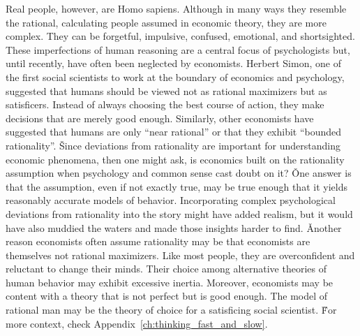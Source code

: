 Real people, however, are Homo sapiens. Although in many ways they resemble the rational, calculating people assumed
in economic theory, they are more complex. They can be forgetful, impulsive, confused, emotional, and shortsighted.
These imperfections of human reasoning are a central focus of psychologists but, until recently, have often been
neglected by economists. Herbert Simon, one of the first social scientists to work at the boundary of economics and
psychology, suggested that humans should be viewed not as rational maximizers but as satisficers. Instead of always
choosing the best course of action, they make decisions that are merely good enough. Similarly, other economists have
suggested that humans are only ``near rational'' or that they exhibit ``bounded rationality''. \v

Since deviations from rationality are important for understanding economic phenomena, then one might ask, is
economics built on the rationality assumption when psychology and common sense cast doubt on it? \v

One answer is that the assumption, even if not exactly true, may be true enough that it yields reasonably accurate
models of behavior. Incorporating complex psychological deviations from rationality into the story might have added
realism, but it would have also muddied the waters and made those insights harder to find. \v

Another reason economists often assume rationality may be that economists are themselves not rational maximizers.
Like most people, they are overconfident and reluctant to change their minds. Their choice among alternative theories
of human behavior may exhibit excessive inertia. Moreover, economists may be content with a theory that is not
perfect but is good enough. The model of rational man may be the theory of choice for a satisficing social scientist. \v

For more context, check Appendix~\ref{ch:thinking_fast_and_slow}.